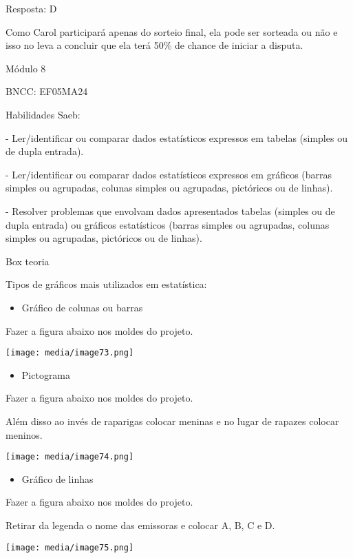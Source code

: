 Resposta: D

Como Carol participará apenas do sorteio final, ela pode ser sorteada ou
não e isso no leva a concluir que ela terá 50\% de chance de iniciar a
disputa.

Módulo 8

BNCC: EF05MA24

Habilidades Saeb:

- Ler/identificar ou comparar dados estatísticos expressos em tabelas
(simples ou de dupla entrada).

- Ler/identificar ou comparar dados estatísticos expressos em gráficos
(barras simples ou agrupadas, colunas simples ou agrupadas, pictóricos
ou de linhas).

- Resolver problemas que envolvam dados apresentados tabelas (simples ou
de dupla entrada) ou gráficos estatísticos (barras simples ou agrupadas,
colunas simples ou agrupadas, pictóricos ou de linhas).

Box teoria

Tipos de gráficos mais utilizados em estatística:

\begin{itemize}
\item
  Gráfico de colunas ou barras
\end{itemize}

Fazer a figura abaixo nos moldes do projeto.

\texttt{[image: media/image73.png]}

\begin{itemize}
\item
  Pictograma
\end{itemize}

Fazer a figura abaixo nos moldes do projeto.

Além disso ao invés de raparigas colocar meninas e no lugar de rapazes
colocar meninos.

\texttt{[image: media/image74.png]}

\begin{itemize}
\item
  Gráfico de linhas
\end{itemize}

Fazer a figura abaixo nos moldes do projeto.

Retirar da legenda o nome das emissoras e colocar A, B, C e D.

\texttt{[image: media/image75.png]}

